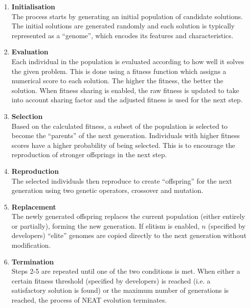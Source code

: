 \documentclass{article}
\begin{document}
\begin{enumerate}
    \item \textbf{Initialisation} \\
    The process starts by generating an initial population of candidate solutions. The initial solutions are generated randomly and each solution is typically represented as a “genome”, which encodes its features and characteristics.

    \item \textbf{Evaluation} \\
    Each individual in the population is evaluated according to how well it solves the given problem. This is done using a fitness function which assigns a numerical score to each solution. The higher the fitness, the better the solution. When fitness sharing is enabled, the raw fitness is updated to take into account sharing factor and the adjusted fitness is used for the next step. 

    \item \textbf{Selection} \\
    Based on the calculated fitness, a subset of the population is selected to become the “parents” of the next generation. Individuals with higher fitness scores have a higher probability of being selected. This is to encourage the reproduction of stronger offsprings in the next step. 

    \item \textbf{Reproduction} \\
    The selected individuals then reproduce to create “offspring” for the next generation using two genetic operators, crossover and mutation. 

    \item \textbf{Replacement} \\
    The newly generated offspring replaces the current population (either entirely or partially), forming the new generation. If elitism is enabled, $n$ (specified by developers) ``elite'' genomes are copied directly to the next generation without modification. 

    \item \textbf{Termination} \\
    Steps 2-5 are repeated until one of the two conditions is met. When either a certain fitness threshold (specified by developers) is reached (i.e. a satisfactory solution is found) or the maximum number of generations is reached, the process of NEAT evolution terminates. 
\end{enumerate}
\end{document}
